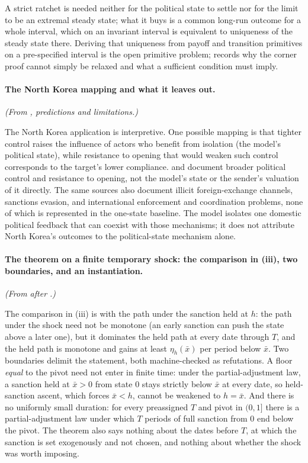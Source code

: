 A strict ratchet is needed neither for the political state to settle nor
for the limit to be an extremal steady state; what it buys is a common
long-run outcome for a whole interval, which on an invariant interval is
equivalent to uniqueness of the steady state there. Deriving that
uniqueness from payoff and transition primitives on a pre-specified interval
is the open primitive problem;  records why the
corner proof cannot simply be relaxed and what a sufficient condition must
imply.

\paragraph{The North Korea mapping and what it leaves out.} \emph{(From , predictions and limitations.)}

The North Korea application is interpretive. One possible mapping is
that tighter control raises the influence of actors who benefit from
isolation (the model's political state), while resistance to opening
that would weaken such control corresponds to the target's lower compliance.
\citet{HaggardNoland2017} and \citet{UNPanelDPRK2024} document broader
political control and resistance to opening, not the model's state or the
sender's valuation of it directly. The same sources also document illicit
foreign-exchange channels, sanctions evasion, and international
enforcement and coordination problems, none of which is represented in
the one-state baseline. The model isolates one domestic political
feedback that can coexist with those mechanisms; it does not attribute
North Korea's outcomes to the political-state mechanism alone.

\paragraph{The theorem on a finite temporary shock: the comparison in (iii), two boundaries, and an instantiation.} \emph{(From after .)}

The comparison in (iii) is with the path under the sanction held at $h$: the
path under the shock need not be monotone (an early sanction can push the state
above a later one), but it dominates the held path at every date through
$T$, and the held path is monotone and gains at least $\eta_h(\bar x)$ per
period below $\bar x$. Two boundaries delimit the statement, both
machine-checked as refutations. A floor \emph{equal} to the pivot need not
enter in finite time: under the partial-adjustment law, a sanction
held at $\bar x>0$ from state $0$ stays strictly below $\bar x$ at every
date, so held-sanction ascent, which forces $\bar x<h$, cannot be weakened to
$h=\bar x$. And there is no
uniformly small duration: for every preassigned $T$ and pivot in $(0,1]$
there is a partial-adjustment law under which $T$ periods of full sanction from $0$ end
below the pivot. The theorem also says nothing about the dates before $T$,
at which the sanction is set exogenously and not chosen, and nothing about whether
the shock was worth imposing.

